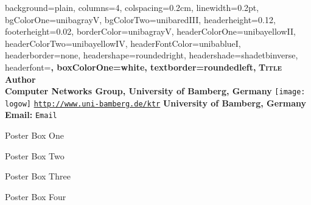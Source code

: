 \documentclass[a0paper,
landscape,
fontscale=0.332,
debug,
hyperref={pdfpagelabels=false}]{baposter}
\begin{document}
\begin{poster}{
  background=plain,%
  columns=4,
  colspacing=0.2cm,
  linewidth=0.2pt,
  bgColorOne=unibagrayV,
  bgColorTwo=unibaredIII,
  headerheight=0.12\textheight,
  footerheight=0.02\textheight,
  borderColor=unibagrayV,
  headerColorOne=unibayellowII,
  headerColorTwo=unibayellowIV,
  headerFontColor=unibablueI,
  headerborder=none,
  headershape=roundedright,
  headershade=shadetbinverse,%
  headerfont=\large\bf,
  boxColorOne=white,
  textborder=roundedleft,
}
{}
 {\Huge\textcolor{unibayellowI}{\textbf{\textsc{Title}}}\normalsize}
 {\LARGE\textcolor{unibagrayV}{\textbf{Author}}\normalsize\\[.5em]
 {\Large\textcolor{unibagrayIV}{\textbf{Computer Networks Group, University of Bamberg, Germany}}\normalsize}}
{\texttt{[image: logow]}}
{\textcolor{unibablueI}{\texttt{\url{http://www.uni-bamberg.de/ktr}}}}
{\textcolor{unibablueI}{\textbf{University of Bamberg, Germany}}}
{\textcolor{unibablueI}{\textbf{Email:} \texttt{Email}}}


\begin{posterbox}[column=0, name=posterboxOne, height=auto]{Poster Box One}
\end{posterbox}

\begin{posterbox}[column=1, span=2,height=auto, name=posterboxTwo, boxpadding=1em]{Poster Box Two}

\end{posterbox}

\begin{posterbox}[column=0,span=2,below=auto,height=bottom, name=posterboxThree]{Poster Box Three}

\end{posterbox}

\begin{posterbox}[column=2,below=posterboxTwo, height=auto, name=posterboxFour]{Poster Box Four}


\end{posterbox}
\end{poster}
\end{document}
